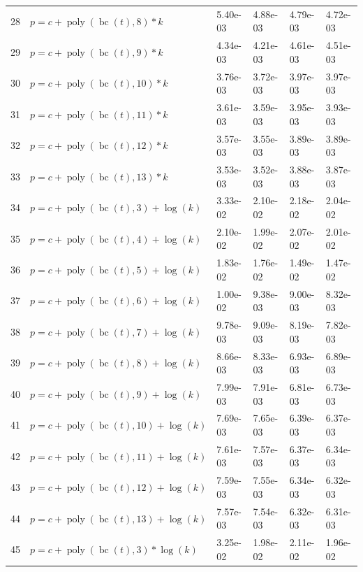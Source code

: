 \documentclass[12pt,a4paper]{article}
\DeclareMathOperator{\bc}{bc}
\DeclareMathOperator{\poly}{poly}
\begin{document}
\begin{longtable}[t]{ll>{\raggedleft\arraybackslash}p{2cm}>{\raggedleft\arraybackslash}p{2cm}>{\raggedleft\arraybackslash}p{2cm}>{\raggedleft\arraybackslash}p{2cm}}
28 & $p = c + \poly\left( \bc(t), 8 \right) * k$ & 5.40e-03 & 4.88e-03 & 4.79e-03 & 4.72e-03\\
\rowcolor{gray!6}  29 & $p = c + \poly\left( \bc(t), 9 \right) * k$ & 4.34e-03 & 4.21e-03 & 4.61e-03 & 4.51e-03\\
30 & $p = c + \poly\left( \bc(t), 10 \right) * k$ & 3.76e-03 & 3.72e-03 & 3.97e-03 & 3.97e-03\\
\rowcolor{gray!6}  31 & $p = c + \poly\left( \bc(t), 11 \right) * k$ & 3.61e-03 & 3.59e-03 & 3.95e-03 & 3.93e-03\\
32 & $p = c + \poly\left( \bc(t), 12 \right) * k$ & 3.57e-03 & 3.55e-03 & 3.89e-03 & 3.89e-03\\
\rowcolor{gray!6}  33 & $p = c + \poly\left( \bc(t), 13 \right) * k$ & 3.53e-03 & 3.52e-03 & 3.88e-03 & 3.87e-03\\
34 & $p = c + \poly\left( \bc(t), 3 \right) + \log(k)$ & 3.33e-02 & 2.10e-02 & 2.18e-02 & 2.04e-02\\
\rowcolor{gray!6}  35 & $p = c + \poly\left( \bc(t), 4 \right) + \log(k)$ & 2.10e-02 & 1.99e-02 & 2.07e-02 & 2.01e-02\\
36 & $p = c + \poly\left( \bc(t), 5 \right) + \log(k)$ & 1.83e-02 & 1.76e-02 & 1.49e-02 & 1.47e-02\\
\rowcolor{gray!6}  37 & $p = c + \poly\left( \bc(t), 6 \right) + \log(k)$ & 1.00e-02 & 9.38e-03 & 9.00e-03 & 8.32e-03\\
38 & $p = c + \poly\left( \bc(t), 7 \right) + \log(k)$ & 9.78e-03 & 9.09e-03 & 8.19e-03 & 7.82e-03\\
\rowcolor{gray!6}  39 & $p = c + \poly\left( \bc(t), 8 \right) + \log(k)$ & 8.66e-03 & 8.33e-03 & 6.93e-03 & 6.89e-03\\
40 & $p = c + \poly\left( \bc(t), 9 \right) + \log(k)$ & 7.99e-03 & 7.91e-03 & 6.81e-03 & 6.73e-03\\
\rowcolor{gray!6}  41 & $p = c + \poly\left( \bc(t), 10 \right) + \log(k)$ & 7.69e-03 & 7.65e-03 & 6.39e-03 & 6.37e-03\\
42 & $p = c + \poly\left( \bc(t), 11 \right) + \log(k)$ & 7.61e-03 & 7.57e-03 & 6.37e-03 & 6.34e-03\\
\rowcolor{gray!6}  43 & $p = c + \poly\left( \bc(t), 12 \right) + \log(k)$ & 7.59e-03 & 7.55e-03 & 6.34e-03 & 6.32e-03\\
44 & $p = c + \poly\left( \bc(t), 13 \right) + \log(k)$ & 7.57e-03 & 7.54e-03 & 6.32e-03 & 6.31e-03\\
\rowcolor{gray!6}  45 & $p = c + \poly\left( \bc(t), 3 \right) * \log(k)$ & 3.25e-02 & 1.98e-02 & 2.11e-02 & 1.96e-02\\

\end{longtable}
\end{document}
